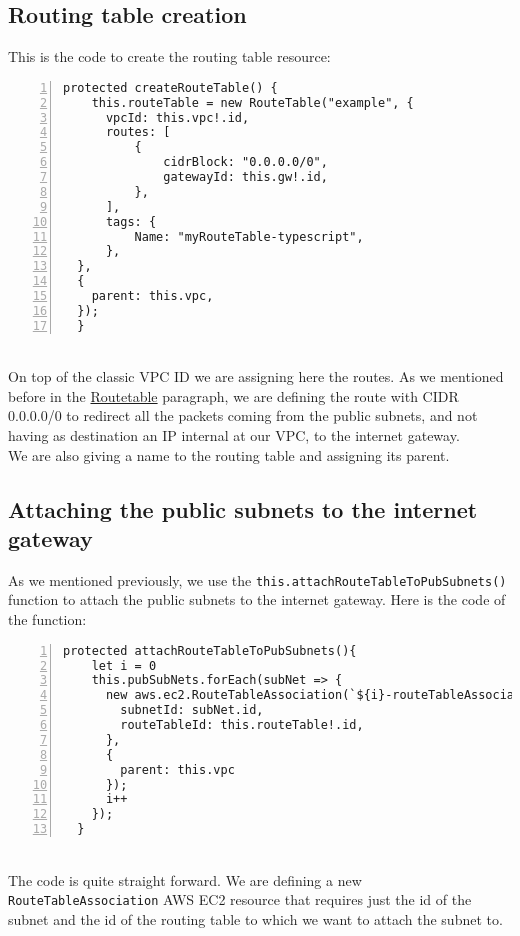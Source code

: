 \subsection{Routing table creation}
This is the code to create the routing table resource:
\begin{lstlisting}[numbers=left, numberstyle=\tiny, numbersep=-5pt, stepnumber=1]
  protected createRouteTable() {
    this.routeTable = new RouteTable("example", {
      vpcId: this.vpc!.id,
      routes: [
          {
              cidrBlock: "0.0.0.0/0",
              gatewayId: this.gw!.id,
          },
      ],
      tags: {
          Name: "myRouteTable-typescript",
      },
  },
  {
    parent: this.vpc,
  });
  }
\end{lstlisting}\mbox{}\\
On top of the classic VPC ID we are assigning here the routes.
As we mentioned before in the \hyperref[sssec:routetable]{Routetable} paragraph, we are defining the route with CIDR 0.0.0.0/0 to redirect all the packets coming from the public subnets, and not having as destination an IP internal at our VPC, to the internet gateway.\\
We are also giving a name to the routing table and assigning its parent.


\subsection{Attaching the public subnets to the internet gateway}
As we mentioned previously, we use the \texttt{this.attachRouteTableToPubSubnets()} function to attach the public subnets to the internet gateway.
Here is the code of the function:
\begin{lstlisting}[numbers=left, numberstyle=\tiny, numbersep=-5pt, stepnumber=1]
  protected attachRouteTableToPubSubnets(){
    let i = 0
    this.pubSubNets.forEach(subNet => {
      new aws.ec2.RouteTableAssociation(`${i}-routeTableAssociation-typescript`, {
        subnetId: subNet.id,
        routeTableId: this.routeTable!.id,
      },
      {
        parent: this.vpc
      });
      i++
    });
  }
\end{lstlisting}\mbox{}\\
The code is quite straight forward. We are defining a new \texttt{RouteTableAssociation} AWS EC2 resource that requires just the id of the subnet and the id of the routing table to which we want to attach the subnet to.

